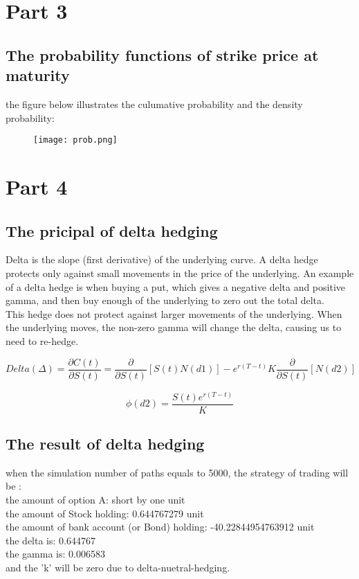 \documentclass[14pt]{extarticle}
\begin{document}
\newpage
\section{Part 3}
\subsection{The probability functions of strike price at maturity}
the figure below illustrates the culumative probability and the density probability:
\begin{figure}[h] 
    \centering 
    \texttt{[image: prob.png]}
 \end{figure}



\section{Part 4}
\subsection{The pricipal of delta hedging}

Delta is the slope (first derivative) of the underlying curve. A delta hedge protects only against small movements in the price of the underlying. An example of a delta hedge is when buying a put, which gives a  negative delta and positive gamma, and then buy enough of the underlying to zero out the total delta. \\
This hedge does not protect against larger movements of the underlying. When the underlying moves, the non-zero gamma will change the delta, causing us to need to re-hedge. 


$$Delta(\Delta)=\frac {\partial C(t)} {\partial S(t)} =\frac{\partial}{\partial S(t)} [S(t) N(d1)]-e^{r(T-t)} K  \frac{\partial}{\partial S(t)}[N(d2)]   $$


$$\phi(d2)=\frac  {S(t)e^{r(T-t)}}{K}  $$

\subsection{The result of delta hedging}
when the simulation number of paths equals to 5000, the strategy of trading will be :\\
the amount of option A: short by one unit\\
the amount of Stock holding: 0.644767279 unit\\
the amount of bank account (or Bond) holding: -40.22844954763912 unit\\
the delta is: 0.644767\\
the gamma is: 0.006583\\
and the 'k' will be zero due to delta-nuetral-hedging.
\end{document}
